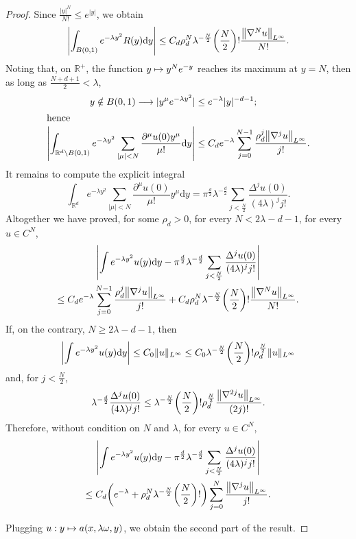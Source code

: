 \documentclass[10pt]{amsart}
\theoremstyle{definition}\newtheorem{defi}[theo]{Definition}\newtheorem{rema}[theo]{Remark}\newtheorem{exam}[theo]{Example}\newtheorem{exem}[theo]{Example}\newtheorem{nota}[theo]{Notation}
\newcommand\1{\mathds{1}}
\newcommand{\R}{\mathbb{R}}
\newcommand{\dd}{\mathrm{d}}
\renewcommand*{\to}{\mathchoice{\longrightarrow}{\rightarrow}{\rightarrow}{\rightarrow}}
\let\oldmapsto\mapsto
\renewcommand*{\mapsto}{\mathchoice{\longmapsto}{\oldmapsto}{\oldmapsto}{\oldmapsto}}
\let\originalleft\left
\let\originalright\right
\renewcommand{\left}{\mathopen{}\mathclose\bgroup\originalleft}
\renewcommand{\right}{\aftergroup\egroup\originalright}
\begin{document}
\begin{proof}
Since $\frac{|y|^N}{N!}\leq e^{|y|}$, we obtain
\[
\left| \int_{B(0,1)}e^{-\lambda y^2}R(y)\dd y\right|\leq C_d\rho_d^N\lambda^{-\frac{N}{2}} \left(\frac{N}{2}\right)!\frac{\left\|\nabla^Nu\right\|_{L^{\infty}}}{N!}.
\]
Noting that, on $\R^+$, the function $y\mapsto y^Ne^{-y}$ reaches its maximum at $y=N$, then as long as $\frac{N+d+1}{2}<\lambda$,
\begin{align*}
y\notin B(0,1)\to |y^{\mu}e^{-\lambda y^2}| &\leq e^{-\lambda}|y|^{-d-1};
\\
\intertext{hence}
\left|\int_{\R^d\setminus B(0,1)}e^{-\lambda y^2}\sum_{|\mu|<N}\frac{\partial^\mu u(0)y^{\mu}}{\mu!}\dd y\right| &\leq C_de^{-\lambda}\sum_{j=0}^{N-1}\frac{\rho_d^j\left\|\nabla^ju\right\|_{L^{\infty}}}{j!}.
\end{align*}
It remains to compute the explicit integral
\[
\int_{\R^d}e^{-\lambda y^2}\sum_{|\mu|<N}\frac{\partial^\mu u(0)}{\mu!}y^{\mu}\dd y=\pi^{\frac d2}\lambda^{-\frac d2}\sum_{j<\frac{N}{2}}\frac{\Delta^ju(0)}{(4\lambda)^jj!}.
\]
Altogether we have proved, for some $\rho_d>0$, for every $N<2\lambda-d-1$, for every $u\in C^N$,
\begin{multline*}
\left|\int e^{-\lambda y^2}u(y)\dd y-\pi^{\frac d2}\lambda^{-\frac d2}\sum_{j<
\frac{N}{2}}\frac{\Delta^ju(0)}{(4\lambda)^jj!}\right|\\
\leq C_de^{-\lambda}\sum_{j=0}^{N-1}\frac{\rho_d^j\left\|\nabla^ju\right\|_{L^{\infty}}}{j!}+C_d\rho_d^N\lambda^{-\frac N2}\left(\frac N2\right)!\frac{\left\|\nabla^Nu\right\|_{L^{\infty}}}{N!}.
\end{multline*}
If, on the contrary, $N\geq 2\lambda-d-1$, then
\[
\left|\int e^{-\lambda y^2}u(y)\dd y\right|\leq C_0\|u\|_{L^{\infty}}\leq C_0\lambda^{-\frac N2}\left(\frac N2\right)!\rho_d^{\frac N2}\|u\|_{L^{\infty}}
\]
and, for $j<\frac N2$,
\[
\lambda^{-\frac d2}\frac{\Delta^ju(0)}{(4\lambda)^jj!}\leq
\lambda^{-\frac N2}\left(\frac N2\right)!\rho_d^{\frac N2}\frac{\left\|\nabla^{2j}u\right\|_{L^{\infty}}}{(2j)!}.
\]
Therefore, without condition on $N$ and $\lambda$, for every $u\in C^N$,
\begin{multline}\label{eq:stat_phase_fixed_order}
\left|\int e^{-\lambda y^2}u(y)\dd y-\pi^{\frac d2}\lambda^{-\frac d2}\sum_{j<
\frac{N}{2}}\frac{\Delta^ju(0)}{(4\lambda)^jj!}\right|\\
\leq C_d\left(e^{-\lambda}+\rho_d^N\lambda^{-\frac N2}\left(\frac N2\right)!\right)\sum_{j=0}^N\frac{\left\|\nabla^ju\right\|_{L^{\infty}}}{j!}.
\end{multline}

Plugging $u:y\mapsto a(x,\lambda \omega,y)$, we obtain the second part of the result.


\end{proof}
\end{document}
